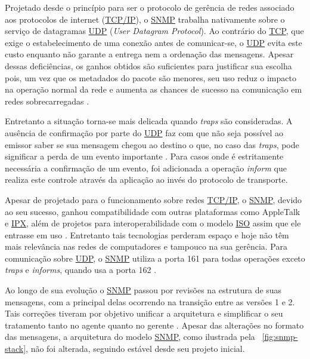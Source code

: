 \documentclass[twoside,english,brazilian]{UNISINOSmonografia}
\begin{document}
Projetado desde o princípio para ser o protocolo de gerência de redes 
associado aos protocolos de internet (\hyperref[siglas]{TCP/IP}), o \hyperref[siglas]{SNMP} trabalha nativamente 
sobre o serviço de datagramas \hyperref[siglas]{UDP} (\textit{User Datagram Protocol}).
Ao contrário do \hyperref[siglas]{TCP}, que exige o estabelecimento de uma conexão antes de 
comunicar-se, o \hyperref[siglas]{UDP} evita este custo enquanto não garante a entrega nem 
a ordenação das mensagens.
Apesar dessas deficiências, os ganhos obtidos são suficientes para justificar 
sua escolha pois, um vez que os metadados do pacote são menores, seu uso reduz 
o impacto na operação normal da rede e aumenta as chances de sucesso na 
comunicação em redes sobrecarregadas \cite{Mauro2009}.


Entretanto a situação torna-se mais delicada quando \textit{traps} são 
consideradas. 
A ausência de confirmação por parte do \hyperref[siglas]{UDP} faz com que não seja possível ao 
emissor saber se sua mensagem chegou ao destino o que, no caso das \textit{traps}, 
pode significar a perda de um evento importante \cite{Clemm2006}.
Para casos onde é estritamente necessária a confirmação de um evento, foi 
adicionada a operação \textit{inform} que realiza este controle através da 
aplicação ao invés do protocolo de transporte.


Apesar de projetado para o funcionamento sobre redes \hyperref[siglas]{TCP/IP}, o \hyperref[siglas]{SNMP}, devido ao 
seu sucesso, ganhou compatibilidade com outras plataformas como AppleTalk e 
\hyperref[siglas]{IPX}, além de projetos para interoperabilidade com o modelo \hyperref[siglas]{ISO} 
assim que ele entrasse em uso \cite{Hunt1997}.
Entretanto tais tecnologias perderam espaço e hoje não têm mais relevância nas 
redes de computadores e tampouco na sua gerência.
Para comunicação sobre \hyperref[siglas]{UDP}, o \hyperref[siglas]{SNMP} utiliza a porta 161 para todas operações 
exceto \textit{traps} e \textit{informs}, quando usa a porta 162 
\cite{Mauro2009}.


Ao longo de sua evolução o \hyperref[siglas]{SNMP} passou por revisões na estrutura de suas 
mensagens, com a principal delas ocorrendo na transição entre as versões 1 e 2.
Tais correções tiveram por objetivo unificar a arquitetura e 
simplificar o seu tratamento tanto no agente quanto no gerente 
\cite{perkins1997understanding}.
Apesar das alterações no formato das mensagens, a arquitetura do modelo \hyperref[siglas]{SNMP}, 
como ilustrada pela ~\autoref{fig:snmp-stack}, não foi alterada, 
seguindo estável desde seu projeto inicial.
\end{document}

